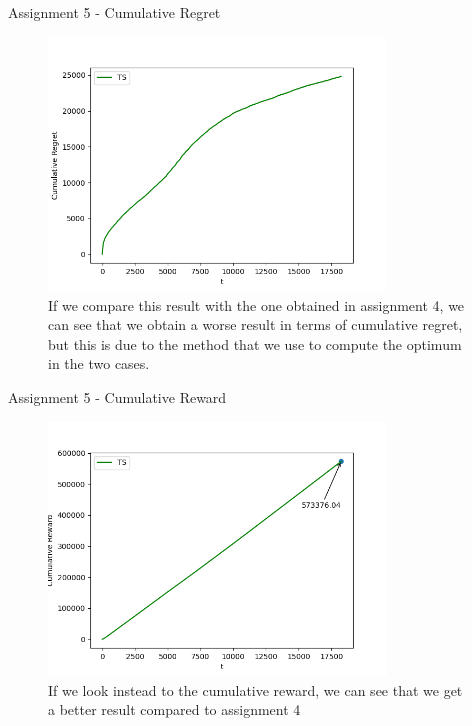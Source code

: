 \documentclass[11pt]{beamer}
\begin{document}
\begin{frame}{Assignment 5 - Cumulative Regret}
\begin{figure}[hbtp]
\centering
\includegraphics[width=0.8\textwidth]{images/assignment_5_cum_regret.png}
\caption{If we compare this result with the one obtained in assignment 4, we can see that we obtain a worse result in terms of cumulative regret, but this is due to the method that we use to compute the optimum in the two cases.}
\end{figure}
\end{frame}

\begin{frame}{Assignment 5 - Cumulative Reward}
\begin{figure}[hbtp]
\centering
\includegraphics[width=0.8\textwidth]{images/assignment_5_reward.png}
\caption{If we look instead to the cumulative reward, we can see that we get a better result compared to assignment 4}
\end{figure}
\end{frame}
\end{document}
